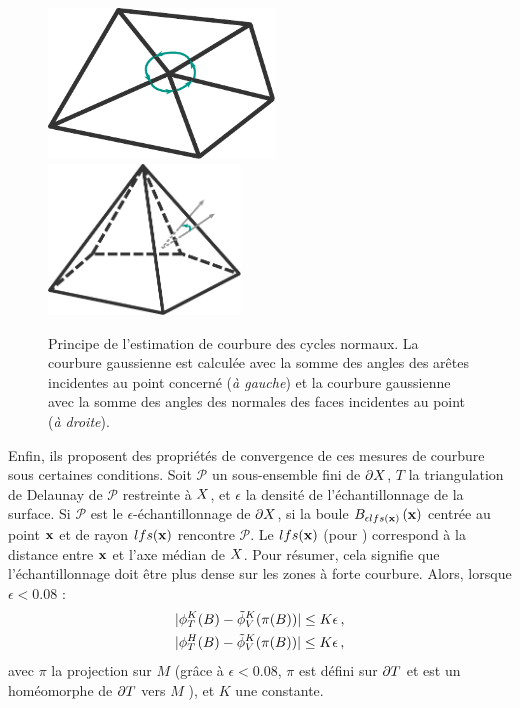 \begin{figure}[ht]{
    \begin{center}
    \includegraphics[height=4cm]{figures/NormalCycle1}
    \includegraphics[height=4cm]{figures/NormalCycle2}
    \end{center}}
    \caption{Principe de l'estimation de courbure des cycles normaux. La courbure gaussienne est calculée avec la somme des angles des arêtes incidentes au point concerné (\emph{à gauche}) et la courbure gaussienne avec la somme des angles des normales des faces incidentes au point (\emph{à droite}).
      \label{fig:normal-cycle}}
\end{figure}

Enfin, ils proposent des propriétés de convergence de ces mesures de courbure
sous certaines conditions. Soit $\mathcal{P}$ un sous-ensemble fini de $\partial X$,
$T$ la triangulation de Delaunay de $\mathcal{P}$ restreinte à $X$, et
$\epsilon$ la densité de l'échantillonnage de la surface. Si $\mathcal{P}$ est
le $\epsilon$-échantillonnage de $\partial X$, \cad si la boule $B_{\epsilon
lfs(\mathbf{x})}\left(\mathbf{x}\right)$ centrée au point $\mathbf{x}$ et de rayon $lfs(\mathbf{x})$ rencontre
$\mathcal{P}$. Le $lfs(\mathbf{x})$ (pour ) correspond à la
distance entre $\mathbf{x}$ et l'axe médian de $X$. Pour résumer, cela signifie
que l'échantillonnage doit être plus dense sur les zones à forte courbure.
Alors, lorsque $\epsilon < 0.08$ :
%
\begin{align}
  &|\phi^{K}_T(B) - \tilde{\phi}^{K}_V(\pi(B)) | \le K\epsilon \,,\\
  &|\phi^{H}_T(B)  - \tilde{\phi}^{K}_V(\pi(B)) | \le K\epsilon \,,
\end{align}
%
avec $\pi$ la projection sur $M$ (grâce à $\epsilon < 0.08$, $\pi$ est défini
sur $\partial T$ et est un homéomorphe de $\partial T$ vers $M$ ), et $K$ une constante.



